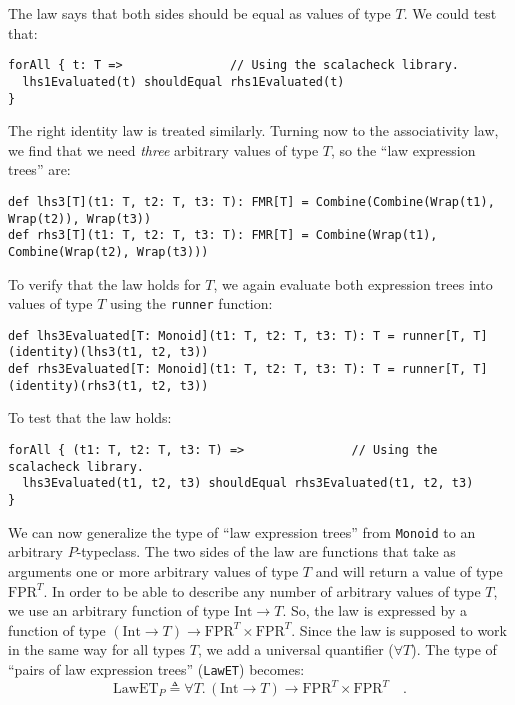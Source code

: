 The law says that both sides should be equal as values of type $T$.
We could test that:
\begin{lstlisting}
forAll { t: T =>               // Using the scalacheck library.
  lhs1Evaluated(t) shouldEqual rhs1Evaluated(t)
}
\end{lstlisting}
The right identity law is treated similarly. Turning now to the associativity
law, we find that we need \emph{three} arbitrary values of type $T$,
so the \textsf{``}law expression trees\textsf{''} are:
\begin{lstlisting}
def lhs3[T](t1: T, t2: T, t3: T): FMR[T] = Combine(Combine(Wrap(t1), Wrap(t2)), Wrap(t3))
def rhs3[T](t1: T, t2: T, t3: T): FMR[T] = Combine(Wrap(t1), Combine(Wrap(t2), Wrap(t3)))
\end{lstlisting}
To verify that the law holds for $T$, we again evaluate both expression
trees into values of type $T$ using the \lstinline!runner!
function:
\begin{lstlisting}
def lhs3Evaluated[T: Monoid](t1: T, t2: T, t3: T): T = runner[T, T](identity)(lhs3(t1, t2, t3))
def rhs3Evaluated[T: Monoid](t1: T, t2: T, t3: T): T = runner[T, T](identity)(rhs3(t1, t2, t3))
\end{lstlisting}
To test that the law holds:
\begin{lstlisting}
forAll { (t1: T, t2: T, t3: T) =>               // Using the scalacheck library.
  lhs3Evaluated(t1, t2, t3) shouldEqual rhs3Evaluated(t1, t2, t3)
}
\end{lstlisting}
We can now generalize the type of \textsf{``}law expression trees\textsf{''} from
\lstinline!Monoid! to an
arbitrary $P$-typeclass. The two sides of the law are functions that
take as arguments one or more arbitrary values of type $T$ and will
return a value of type $\text{FPR}^{T}$. In order to be able to describe
any number of arbitrary values of type $T$, we use an arbitrary function
of type $\text{Int}\rightarrow T$. So, the law is expressed by a
function of type $(\text{Int}\rightarrow T)\rightarrow\text{FPR}^{T}\times\text{FPR}^{T}$.
Since the law is supposed to work in the same way for all types $T$,
we add a universal quantifier ($\forall T$). The type of \textsf{``}pairs
of law expression trees\textsf{''} (\lstinline!LawET!)
becomes:
\begin{equation}
\text{LawET}_{P}\triangleq\forall T.\,(\text{Int}\rightarrow T)\rightarrow\text{FPR}^{T}\times\text{FPR}^{T}\quad.\label{eq:law-expression-tree-type}
\end{equation}


